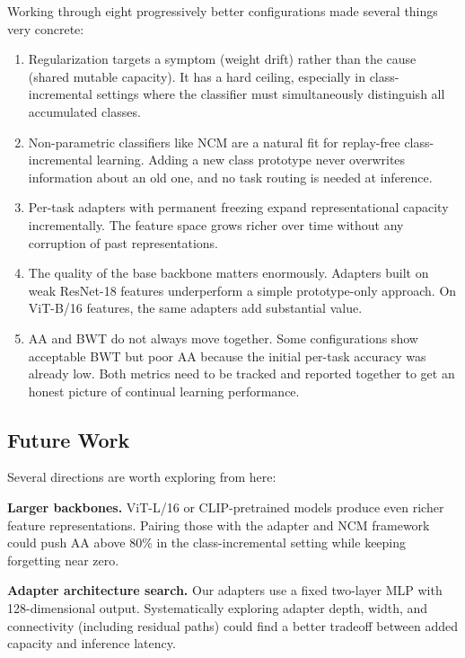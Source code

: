 \documentclass{article}
\begin{document}
Working through eight progressively better configurations made several things
very concrete:

\begin{enumerate}[leftmargin=*]
  \item Regularization targets a symptom (weight drift) rather than the cause
    (shared mutable capacity). It has a hard ceiling, especially in
    class-incremental settings where the classifier must simultaneously
    distinguish all accumulated classes.
  \item Non-parametric classifiers like NCM are a natural fit for replay-free
    class-incremental learning. Adding a new class prototype never overwrites
    information about an old one, and no task routing is needed at inference.
  \item Per-task adapters with permanent freezing expand representational
    capacity incrementally. The feature space grows richer over time without
    any corruption of past representations.
  \item The quality of the base backbone matters enormously. Adapters built on
    weak ResNet-18 features underperform a simple prototype-only approach. On
    ViT-B/16 features, the same adapters add substantial value.
  \item AA and BWT do not always move together. Some configurations show
    acceptable BWT but poor AA because the initial per-task accuracy was already
    low. Both metrics need to be tracked and reported together to get an honest
    picture of continual learning performance.
\end{enumerate}

\subsection{Future Work}

Several directions are worth exploring from here:

\textbf{Larger backbones.} ViT-L/16 or CLIP-pretrained models produce even
richer feature representations. Pairing those with the adapter and NCM framework
could push AA above 80\% in the class-incremental setting while keeping
forgetting near zero.

\textbf{Adapter architecture search.} Our adapters use a fixed two-layer MLP
with 128-dimensional output. Systematically exploring adapter depth, width, and
connectivity (including residual paths) could find a better tradeoff between
added capacity and inference latency.
\end{document}
